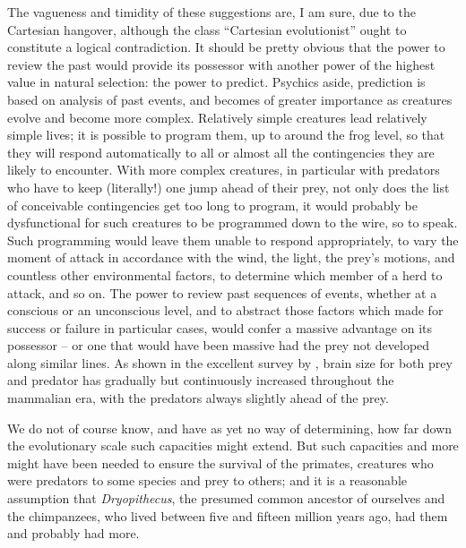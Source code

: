 The vagueness and timidity of these suggestions are, I am sure, due to the Cartesian hangover, although the class ``Cartesian evolutionist'' ought to constitute a logical contradiction. It should be pretty
obvious that the power to review the past would provide its possessor with another power of the highest value in natural selection: the power to predict. Psychics aside, prediction is based on analysis of past events, and becomes of greater importance as creatures evolve and become more complex. Relatively simple creatures lead relatively simple lives; it is possible to program them, up to around the frog level, so that they will respond automatically to all or almost all the contingencies they are likely to encounter. With more complex creatures, in particular with predators who have to keep (literally!) one jump ahead of their prey, not only does the list of conceivable contingencies get too long to program, it would probably be dysfunctional for such creatures to be programmed down to the wire, so to speak. Such programming would leave them unable to respond appropriately, to vary the moment of attack in accordance with the wind, the light, the prey's motions, and countless other environmental factors, to determine which member of a herd to attack, and so on. The power to review past sequences of events, whether at a conscious or an unconscious level, and to abstract those factors which made for success or failure in particular cases, would confer a massive advantage on its possessor -- or one that would have been massive had the prey not developed along similar lines. As shown in the excellent survey by \citet{Jerison1973}, brain size for both prey and predator has gradually but continuously increased throughout the mammalian era, with the predators always slightly ahead of the prey.

We do not of course know, and have as yet no way of determining, how far down the evolutionary scale such capacities might extend. But such capacities and more might have been needed to ensure the survival of the primates, creatures who were predators to some species and prey to others; and it is a reasonable assumption that \textit{Dryopithecus}, the presumed common ancestor of ourselves and the chimpanzees, who lived between five and fifteen million years ago, had them and probably had more.

